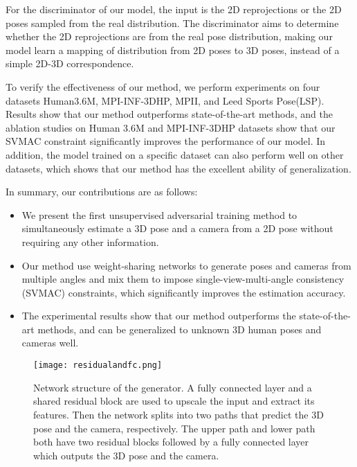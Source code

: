 \documentclass[10pt,twocolumn,letterpaper]{article}
\begin{document}
For the discriminator of our model, the input is the 2D reprojections or the 2D poses sampled from the real distribution. The discriminator aims to determine whether the 2D reprojections are from the real pose distribution, making our model learn a mapping of distribution from 2D poses to 3D poses, instead of a simple 2D-3D correspondence.

To verify the effectiveness of our method, we perform experiments on four datasets Human3.6M\cite{2014Human3}, MPI-INF-3DHP\cite{2017Monocular}, MPII\cite{2014Human}, and Leed Sports Pose(LSP)\cite{2010Clustered}. Results show that our method outperforms state-of-the-art methods, and the ablation studies on Human 3.6M and MPI-INF-3DHP datasets show that our SVMAC constraint significantly improves the performance of our model. In addition, the model trained on a specific dataset can also perform well on other datasets, which shows that our method has the excellent ability of generalization.

In summary, our contributions are as follows:
\begin{itemize}
\item We present the first unsupervised adversarial training method to simultaneously estimate a 3D pose and a camera from a 2D pose without requiring any other information.
\item Our method use weight-sharing networks to generate poses and cameras from multiple angles and mix them to impose single-view-multi-angle consistency (SVMAC) constraints, which significantly improves the estimation accuracy.
\item The experimental results show that our method outperforms the state-of-the-art methods, and can be generalized to unknown 3D human poses and cameras well.
\end{itemize}

\begin{figure*}[htbp]
\centering
\texttt{[image: residualandfc.png]}
\caption{Network structure of the generator. A fully connected layer and a shared residual block are used to upscale the input and extract its features. Then the network splits into two paths that predict the 3D pose and the camera, respectively. The upper path and lower path both have two residual blocks followed by a fully connected layer which outputs the 3D pose and the camera.}
\label{generator}
\end{figure*}
\end{document}
